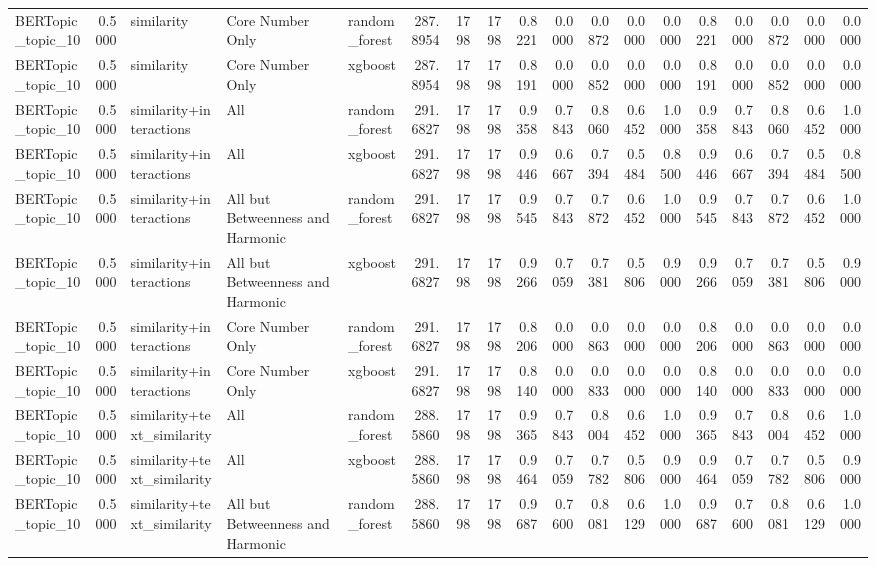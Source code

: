 \begin{tabular}{lrlllrrrrrrrrrrrrr}
BERTopic_topic_10 & 0.5000 & similarity & Core Number Only & random_forest & 287.8954 & 1798 & 1798 & 0.8221 & 0.0000 & 0.0872 & 0.0000 & 0.0000 & 0.8221 & 0.0000 & 0.0872 & 0.0000 & 0.0000 \\
BERTopic_topic_10 & 0.5000 & similarity & Core Number Only & xgboost & 287.8954 & 1798 & 1798 & 0.8191 & 0.0000 & 0.0852 & 0.0000 & 0.0000 & 0.8191 & 0.0000 & 0.0852 & 0.0000 & 0.0000 \\
BERTopic_topic_10 & 0.5000 & similarity+interactions & All & random_forest & 291.6827 & 1798 & 1798 & 0.9358 & 0.7843 & 0.8060 & 0.6452 & 1.0000 & 0.9358 & 0.7843 & 0.8060 & 0.6452 & 1.0000 \\
BERTopic_topic_10 & 0.5000 & similarity+interactions & All & xgboost & 291.6827 & 1798 & 1798 & 0.9446 & 0.6667 & 0.7394 & 0.5484 & 0.8500 & 0.9446 & 0.6667 & 0.7394 & 0.5484 & 0.8500 \\
BERTopic_topic_10 & 0.5000 & similarity+interactions & All but Betweenness and Harmonic & random_forest & 291.6827 & 1798 & 1798 & 0.9545 & 0.7843 & 0.7872 & 0.6452 & 1.0000 & 0.9545 & 0.7843 & 0.7872 & 0.6452 & 1.0000 \\
BERTopic_topic_10 & 0.5000 & similarity+interactions & All but Betweenness and Harmonic & xgboost & 291.6827 & 1798 & 1798 & 0.9266 & 0.7059 & 0.7381 & 0.5806 & 0.9000 & 0.9266 & 0.7059 & 0.7381 & 0.5806 & 0.9000 \\
BERTopic_topic_10 & 0.5000 & similarity+interactions & Core Number Only & random_forest & 291.6827 & 1798 & 1798 & 0.8206 & 0.0000 & 0.0863 & 0.0000 & 0.0000 & 0.8206 & 0.0000 & 0.0863 & 0.0000 & 0.0000 \\
BERTopic_topic_10 & 0.5000 & similarity+interactions & Core Number Only & xgboost & 291.6827 & 1798 & 1798 & 0.8140 & 0.0000 & 0.0833 & 0.0000 & 0.0000 & 0.8140 & 0.0000 & 0.0833 & 0.0000 & 0.0000 \\
BERTopic_topic_10 & 0.5000 & similarity+text_similarity & All & random_forest & 288.5860 & 1798 & 1798 & 0.9365 & 0.7843 & 0.8004 & 0.6452 & 1.0000 & 0.9365 & 0.7843 & 0.8004 & 0.6452 & 1.0000 \\
BERTopic_topic_10 & 0.5000 & similarity+text_similarity & All & xgboost & 288.5860 & 1798 & 1798 & 0.9464 & 0.7059 & 0.7782 & 0.5806 & 0.9000 & 0.9464 & 0.7059 & 0.7782 & 0.5806 & 0.9000 \\
BERTopic_topic_10 & 0.5000 & similarity+text_similarity & All but Betweenness and Harmonic & random_forest & 288.5860 & 1798 & 1798 & 0.9687 & 0.7600 & 0.8081 & 0.6129 & 1.0000 & 0.9687 & 0.7600 & 0.8081 & 0.6129 & 1.0000 \\

\end{tabular}
